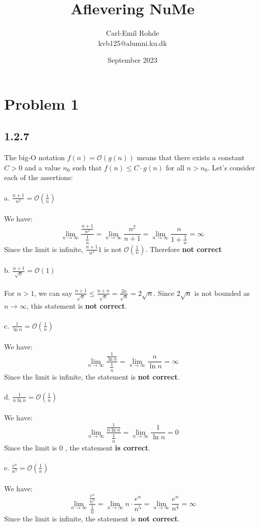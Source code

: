 \documentclass{article}
\title{Aflevering  NuMe}
\author{Carl-Emil Rohde \\ kvb125@alumni.ku.dk}
\date{September 2023}
\begin{document}
\maketitle

\section*{Problem 1}

\subsection*{1.2.7}
The big-O notation $f(n)=\mathcal{O}(g(n))$ means that there exists a constant $C>0$ and a value $n_0$ such that $f(n) \leq C \cdot g(n)$ for all $n>n_0$.
Let's consider each of the assertions:
\\
\\
a. $\frac{n+1}{n^2}=\mathcal{O}\left(\frac{1}{n}\right)$
\\
\\
We have:
$$
\lim _{n \rightarrow \infty} \frac{\frac{n+1}{n^2}}{\frac{1}{n}}=\lim _{n \rightarrow \infty} \frac{n^2}{n+1}=\lim _{n \rightarrow \infty} \frac{n}{1+\frac{1}{n}}=\infty
$$
Since the limit is infinite, $\frac{n+1}{n^2} 1$ is not $\mathcal{O}\left(\frac{1}{n}\right)$. Therefore \textbf{not correct}
\\
\\
b. $\frac{n+1}{\sqrt{n}}=\mathcal{O}(1)$
\\
\\
For $n>1$, we can say $\frac{n+1}{\sqrt{n}} \leq \frac{n+n}{\sqrt{n}}=\frac{2 n}{\sqrt{n}}=2 \sqrt{n}$.
Since $2 \sqrt{n}$ is not bounded as $n \rightarrow \infty$, this statement is \textbf{not correct}.
\\
\\
c. $\frac{1}{\ln n}=\mathcal{O}\left(\frac{1}{n}\right)$
\\
\\
We have:
$$
\lim _{n \rightarrow \infty} \frac{\frac{1}{\ln n}}{\frac{1}{n}}=\lim _{n \rightarrow \infty} \frac{n}{\ln n}=\infty
$$
Since the limit is infinite, the statement is \textbf{not correct}.
\\
\\
d. $\frac{1}{n \ln n}=\mathcal{O}\left(\frac{1}{n}\right)$
\\
\\
We have:
$$
\lim _{n \rightarrow \infty} \frac{\frac{1}{n \ln n}}{\frac{1}{n}}=\lim _{n \rightarrow \infty} \frac{1}{\ln n}=0
$$
Since the limit is 0 , the statement \textbf{is correct}.
\\
\\
e. $\frac{e^n}{n^5}=\mathcal{O}\left(\frac{1}{n}\right)$
\\
\\
We have:
$$
\lim _{n \rightarrow \infty} \frac{\frac{e^n}{n^5}}{\frac{1}{n}}=\lim _{n \rightarrow \infty} n \cdot \frac{e^n}{n^5}=\lim _{n \rightarrow \infty} \frac{e^n}{n^4}=\infty
$$
Since the limit is infinite, the statement is \textbf{not correct}.
\end{document}
